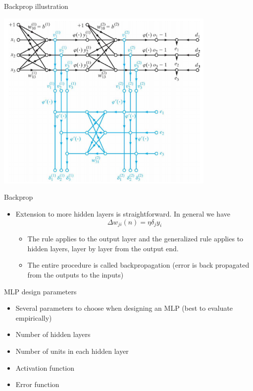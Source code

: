 \documentclass[notes]{beamer}
\providecommand{\tightlist}{%
  \setlength{\itemsep}{0pt}\setlength{\parskip}{0pt}}
\begin{document}
\begin{frame}{Backprop illustration}

\includegraphics[width=0.80000\textwidth]{2018-03-10-15-46-32.png} ~

\end{frame}

\begin{frame}{Backprop}

\begin{itemize}
\tightlist
\item
  Extension to more hidden layers is straightforward. In general we have
  \[ \Delta w_ {ji} (n) = \eta \delta _j y_i\]

  \begin{itemize}
  \tightlist
  \item
    The rule applies to the output layer and the generalized rule
    applies to hidden layers, layer by layer from the output end.
  \item
    The entire procedure is called backpropagation (error is back
    propagated from the outputs to the inputs)
  \end{itemize}
\end{itemize}

\end{frame}

\begin{frame}{MLP design parameters}

\begin{itemize}
\tightlist
\item
  Several parameters to choose when designing an MLP (best to evaluate
  empirically)
\item
  Number of hidden layers
\item
  Number of units in each hidden layer
\item
  Activation function
\item
  Error function
\end{itemize}

\end{frame}
\end{document}
